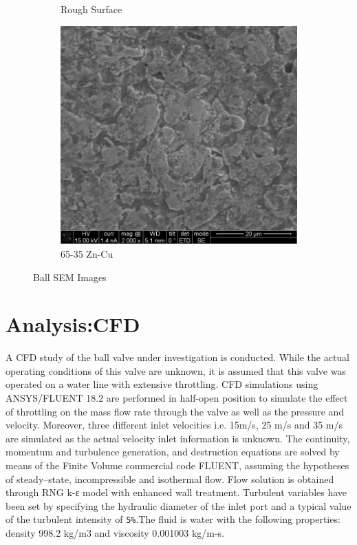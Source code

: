 \documentclass[]{article}
\begin{document}
\begin{figure}[h]
\begin{subfigure}[h]{0.32\textwidth}
		\caption{Rough Surface}
	\end{subfigure}
	\begin{subfigure}[h]{0.32\textwidth}
		\includegraphics[width=\textwidth]{Photos/SEM_03}
		\caption{65-35 Zn-Cu}
	\end{subfigure}
	\caption{Ball SEM Images}\label{fig:BallSEM}
\end{figure}

\section{Analysis:CFD}
A CFD study of the ball valve under investigation is conducted. While the actual operating conditions of this valve are unknown, it is assumed that this valve was operated on a water line with extensive throttling. CFD simulations using ANSYS/FLUENT 18.2 are performed in half-open position to simulate the effect of throttling on the mass flow rate through the valve as well as the pressure and velocity. Moreover, three different inlet velocities i.e. 15m/s, 25 m/s and 35 m/s are simulated as the actual velocity inlet information is unknown.
The continuity, momentum and turbulence generation, and destruction equations are solved by means of the Finite Volume commercial code FLUENT, assuming the hypotheses of steady–state, incompressible and isothermal flow. Flow solution is obtained through RNG k-ε model with enhanced wall treatment. Turbulent variables have been set by specifying the hydraulic diameter of the inlet port and a typical value of the turbulent intensity of \verb|5%|.The fluid is water with the following properties: density 998.2 kg/m3 and viscosity 0.001003 kg/m-s.
\end{document}
